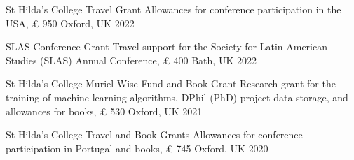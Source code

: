





\vspace{1mm}

\begin{cvhonors}
\cvhonor
{St Hilda's College Travel Grant} 
{Allowances for conference participation in the USA, {\pounds} 950} 
{Oxford, UK}
{2022}
\end{cvhonors}

\vspace{1mm}

\begin{cvhonors}
\cvhonor
{SLAS Conference Grant} 
{Travel support for the Society for Latin American Studies (SLAS) Annual Conference, {\pounds} 400}
{Bath, UK}
{2022}
\end{cvhonors}

\vspace{1mm}

\begin{cvhonors}
\cvhonor
{St Hilda's College Muriel Wise Fund and Book Grant} 
{Research grant for the training of machine learning algorithms, DPhil (PhD) project data storage, and allowances for books, {\pounds} 530} 
{Oxford, UK}
{2021}
\end{cvhonors}

\vspace{1mm}

\begin{cvhonors}
\cvhonor
{St Hilda's College Travel and Book Grants} 
{Allowances for conference participation in Portugal and books, {\pounds} 745} 
{Oxford, UK}
{2020}
\end{cvhonors}

\vspace{1mm}


